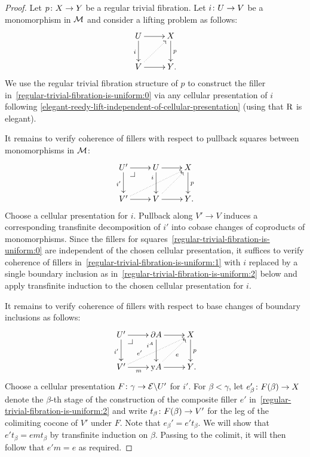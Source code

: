 \documentclass[reqno,10pt,a4paper,oneside,draft]{amsart}
\begin{document}
\begin{proof}
Let $p \co X \to Y$ be a regular trivial fibration.
Let $i \co U \to V$ be a monomorphism in $\cal{M}$ and consider a lifting problem as follows:
\begin{equation} \label{regular-trivial-fibration-is-uniform:0}
\xycenter{
  U
  \ar[d]_{i}
  \ar[r]
&
  X
  \ar[d]^{p}
\\
  V
  \ar[r]
  \ar@{.>}[ur]
&
  Y
\rlap{.}}
\end{equation}
We use the regular trivial fibration structure of $p$ to construct the filler in~\eqref{regular-trivial-fibration-is-uniform:0} via any cellular presentation of $i$ following \cref{elegant-reedy-lift-independent-of-cellular-presentation} (using that $\R$ is elegant).

It remains to verify coherence of fillers with respect to pullback squares between monomorphisms in $\cal{M}$:
\begin{equation} \label{regular-trivial-fibration-is-uniform:1}
\xycenter{
  U'
  \ar[d]_{i'}
  \ar[r]
  \pullback{dr}
&
  U
  \ar[d]_(0.3){i}
  \ar[r]
&
  X
  \ar[d]^{p}
\\
  V'
  \ar[r]
  \ar@{.>}[urr]
&
  V
  \ar[r]
  \ar@{.>}[ur]
&
  Y
\rlap{.}}
\end{equation}
Choose a cellular presentation for $i$.
Pullback along $V' \to V$ induces a corresponding transfinite decomposition of $i'$ into cobase changes of coproducts of monomorphisms.
Since the fillers for squares~\eqref{regular-trivial-fibration-is-uniform:0} are independent of the chosen cellular presentation, it suffices to verify coherence of fillers in~\eqref{regular-trivial-fibration-is-uniform:1} with $i$ replaced by a single boundary inclusion as in~\eqref{regular-trivial-fibration-is-uniform:2} below and apply transfinite induction to the chosen cellular presentation for $i$.

It remains to verify coherence of fillers with respect to base changes of boundary inclusions as follows:
\begin{equation} \label{regular-trivial-fibration-is-uniform:2}
\xycenter{
  U'
  \ar[d]_{i'}
  \ar[r]
  \pullback{dr}
&
  \partial A
  \ar[d]_(0.3){i^A}
  \ar[r]
&
  X
  \ar[d]^{p}
\\
  V'
  \ar[r]_{m}
  \ar@{.>}[urr]^(0.3){e'}
&
  \yon A
  \ar[r]
  \ar@{.>}[ur]_{e}
&
  Y
\rlap{.}}
\end{equation}
Choose a cellular presentation $F \co \gamma \to \catE \backslash U'$ for $i'$.
For $\beta < \gamma$, let $e_{\beta}' \co F(\beta) \to X$ denote the $\beta$-th stage of the construction of the composite filler $e'$ in~\eqref{regular-trivial-fibration-is-uniform:2} and write $t_{\beta} \co F(\beta) \to V'$ for the leg of the colimiting cocone of $V'$ under $F$.
Note that $e_{\beta}' = e' t_{\beta}$.
We will show that $e' t_{\beta} = e m t_{\beta}$ by transfinite induction on $\beta$.
Passing to the colimit, it will then follow that $e' m = e$ as required.


\end{proof}
\end{document}
